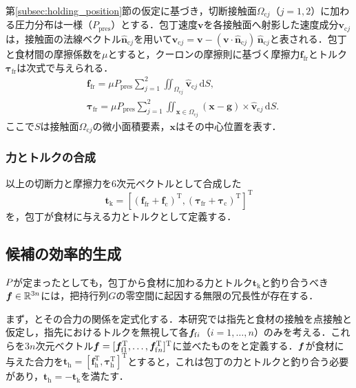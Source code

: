 第\ref{subsec:holding_position}節の仮定に基づき，切断接触面$\Omega_{\mathrm{c}j}$（$j = 1, 2$）に加わる圧力分布は一様（$P_{\mathrm{pres}}$）とする．包丁速度$\bm{v}$を各接触面へ射影した速度成分$\bm{v}_{\mathrm{c}j}$は，接触面の法線ベクトル$\hat{\bm{n}}_{\mathrm{c}j}$を用いて$\bm{v}_{\mathrm{c}j} = \bm{v} - (\bm{v} \cdot \hat{\bm{n}}_{\mathrm{c}j})\,\hat{\bm{n}}_{\mathrm{c}j}$と表される．包丁と食材間の摩擦係数を$\mu$とすると，クーロンの摩擦則に基づく摩擦力$\bm{f}_{\mathrm{fr}}$とトルク$\bm{\tau}_{\mathrm{fr}}$は次式で与えられる．
\begin{align*}
    & \bm{f}_{\mathrm{fr}} = \mu P_{\mathrm{pres}} \sum_{j=1}^2 \iint_{\Omega_{\mathrm{c}j}} \hat{\bm{v}}_{\mathrm{c}j} \, \mathrm{d}S,\\
    & \bm{\tau}_{\mathrm{fr}} = \mu P_{\mathrm{pres}} \sum_{j=1}^2 \iint_{\bm{x} \in \Omega_{\mathrm{c}j}} (\bm{x} - \bm{g}) \times \hat {\bm{v}}_{\mathrm{c}j}\, \mathrm{d}S.
\end{align*}
ここで$S$は接触面$\Omega_{\mathrm{c}j}$の微小面積要素，$\bm{x}$はその中心位置を表す．

\subsubsection{力とトルクの合成}

以上の切断力と摩擦力を6次元ベクトルとして合成した
\begin{equation}
\bm{t}_{\mathrm{k}} = \left[ \left( \bm{f}_{\mathrm{fr}} + \bm{f}_{\mathrm{c}} \right)^{\mathrm{T}}, \left( \bm{\tau}_{\mathrm{fr}} + \bm{\tau}_{\mathrm{c}} \right)^{\mathrm{T}} \right]^{\mathrm{T}}
\label{equ:holding_knife_wrench}
\end{equation}
を，包丁が食材に与える力とトルクとして定義する．


\subsection{{\namegraspforce}候補の効率的生成}
\label{subsec:holding_force_generation}

{\nameholdingpointset}$\equholdingpointset$が定まったとしても，包丁から食材に加わる力とトルク$\bm{t}_{\mathrm{k}}$と釣り合うべき{\namegraspforce}$\bm{f}\in\mathbb{R}^{3n}$には，把持行列$G$の零空間に起因する無限の冗長性が存在する．

まず，{\namegraspforce}とその合力の関係を定式化する．本研究では指先と食材の接触を点接触と仮定し，指先におけるトルクを無視して各{\namefingerforce}$\equfingerforce[i]$（$i = 1,\ldots, n$）のみを考える．これらを$3n$次元ベクトル$\equgraspforce = [\equfingerforce[1]^{\mathrm{T}},\ldots, \equfingerforce[n]^{\mathrm{T}}]^{\mathrm{T}}$に並べたものを{\namegraspforce}と定義する．{\namegraspforce}$\bm{f}$が食材に与えた合力を$\bm{t}_{\mathrm{h}} = [\bm{f}_{\mathrm{h}}^{\mathrm{T}}, \bm{\tau}_{\mathrm{h}}^{\mathrm{T}}]^{\mathrm{T}}$とすると，これは包丁の力とトルクと釣り合う必要があり，$\bm{t}_{\mathrm{h}} = -\bm{t}_{\mathrm{k}}$を満たす．

